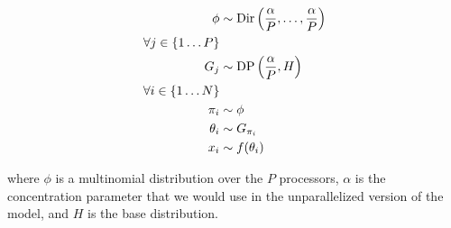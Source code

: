 \begin{align*}
    \phi &\sim \mathrm{Dir}\left(\frac{\alpha}{P}, \ldots, \frac{\alpha}{P}\right) \\
    \forall j \in \{1 \ldots P\} & \\
    G_j &\sim \mathrm{DP}\left(\frac{\alpha}{P}, H\right) \\
    \forall i \in \{1 \ldots N\} & \\
                           \pi_i & \sim \phi \\
                        \theta_i & \sim G_{\pi_i} \\
                             x_i & \sim f(\theta_i)
\end{align*}

where $\phi$ is a multinomial distribution over the $P$ processors,
$\alpha$ is the concentration parameter that we would use in the
unparallelized version of the model, and $H$ is the base distribution.
